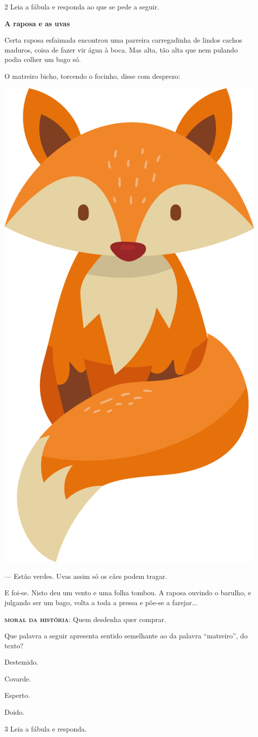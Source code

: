 \num{2} Leia a fábula e responda ao que se pede a seguir.

\begin{myquote}
\textbf{A raposa e as uvas} \bigskip 

Certa raposa esfaimada encontrou uma parreira carregadinha de lindos cachos maduros, coisa de fazer vir água à boca. Mas alta, tão alta que nem pulando podia colher um bago só.

O matreiro bicho, torcendo o focinho, disse com desprezo:

\begin{center}
\includegraphics[width=.2\textwidth]{./media/image1e.png}
\end{center}

--- Estão verdes. Uvas assim só os cães podem tragar.

E foi-se. Nisto deu um vento e uma folha tombou. A raposa ouvindo o barulho, e julgando ser um bago, volta a toda a pressa e põe-se a farejar... \medskip

\noindent\textsc{\textbf{moral da história}}: Quem desdenha quer comprar.

\end{myquote}

\noindent Que palavra a seguir apresenta sentido semelhante ao da palavra
``matreiro'', do texto?

\begin{escolha}[itemsep=-5pt]
\item Destemido.

\item Covarde.

\item Esperto.

\item Doido.
\end{escolha}

\num{3} Leia a fábula e responda.

